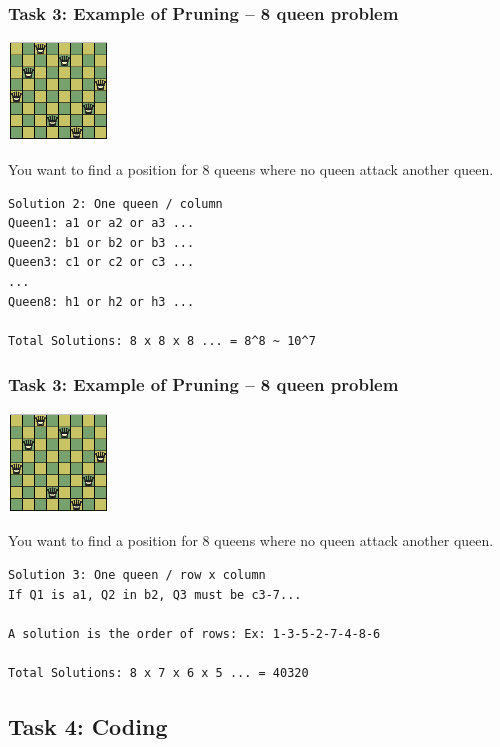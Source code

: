 \begin{frame}[fragile]
  \frametitle{Task 3: Example of Pruning -- 8 queen problem}

  \hfill \includegraphics[width=0.2\textwidth]{../img/8queen}

  You want to find a position for 8 queens where no queen attack another queen.

  \bigskip

\begin{verbatim}
Solution 2: One queen / column
Queen1: a1 or a2 or a3 ...
Queen2: b1 or b2 or b3 ...
Queen3: c1 or c2 or c3 ...
...
Queen8: h1 or h2 or h3 ...

Total Solutions: 8 x 8 x 8 ... = 8^8 ~ 10^7
\end{verbatim}
\end{frame}

\begin{frame}[fragile]
  \frametitle{Task 3: Example of Pruning -- 8 queen problem}

  \hfill \includegraphics[width=0.2\textwidth]{../img/8queen}

  You want to find a position for 8 queens where no queen attack another queen.

  \bigskip

\begin{verbatim}
Solution 3: One queen / row x column
If Q1 is a1, Q2 in b2, Q3 must be c3-7...

A solution is the order of rows: Ex: 1-3-5-2-7-4-8-6

Total Solutions: 8 x 7 x 6 x 5 ... = 40320
\end{verbatim}
\end{frame}

\subsection{Task 4: Coding}


